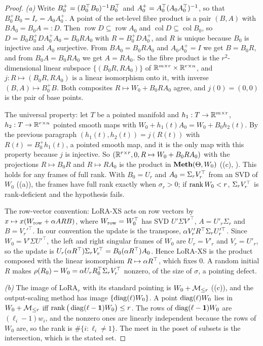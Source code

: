 \begin{proof}
\emph{(a)} Write $B_0^+=(B_0^{\top} B_0)^{-1}B_0^{\top}$ and $A_0^+=A_0^{\top}(A_0A_0^{\top})^{-1}$, so that $B_0^+B_0=I_r=A_0A_0^+$. A point of
the set-level fibre product is a pair $(B,A)$ with $BA_0=B_0A=:D$. Then $\operatorname{row}D\subseteq\operatorname{row}A_0$
and $\operatorname{col}D\subseteq\operatorname{col}B_0$, so $D=B_0B_0^+DA_0^+A_0=B_0RA_0$ with $R=B_0^+DA_0^+$, and $R$ is
unique because $B_0$ is injective and $A_0$ surjective. From $BA_0=B_0RA_0$ and $A_0A_0^+=I$ we get $B=B_0R$, and from
$B_0A=B_0RA_0$ we get $A=RA_0$. So the fibre product is the $r^2$-dimensional linear subspace $\{(B_0R,RA_0)\}$ of
$\mathbb{R}^{m\times r}\times\mathbb{R}^{r\times n}$, and $j:R\mapsto(B_0R,RA_0)$ is a linear isomorphism onto it, with inverse
$(B,A)\mapsto B_0^+B$. Both composites $R\mapsto W_0+B_0RA_0$ agree, and $j(0)=(0,0)$ is the pair of base points.

The universal property: let $T$ be a pointed manifold and $h_1:T\to\mathbb{R}^{m\times r}$, $h_2:T\to\mathbb{R}^{r\times n}$ pointed smooth
maps with $W_0+h_1(t)A_0=W_0+B_0h_2(t)$. By the previous paragraph $(h_1(t),h_2(t))=j(R(t))$ with $R(t)=B_0^+h_1(t)$, a
pointed smooth map, and it is the only map with this property because $j$ is injective. So $(\mathbb{R}^{r\times r},0,R\mapsto
W_0+B_0RA_0)$ with the projections $R\mapsto B_0R$ and $R\mapsto RA_0$ is the product in $\mathbf{Meth}(\Theta,W_0)$
((c), ). This holds for any frames of full rank. With $B_0=U_r$ and $A_0=\Sigma_rV_r^{\top}$ from an SVD
of $W_0$ ((a)), the frames have full rank exactly when $\sigma_r>0$; if $\operatorname{rank} W_0<r$, $\Sigma_rV_r^{\top}$ is
rank-deficient and the hypothesis fails.

The row-vector convention: LoRA-XS acts on row vectors by $x\mapsto x(W_{\rm row}+\alpha ARB)$, where $W_{\rm row}=W_0^{\top}$
has SVD $U'\Sigma V'^{\top}$, $A=U'_r\Sigma_r$ and $B=V_r'^{\top}$. In our convention the update is the transpose,
$\alpha V'_rR^{\top}\Sigma_rU_r'^{\top}$. Since $W_0=V'\Sigma U'^{\top}$, the left and right singular frames of $W_0$ are
$U_r=V'_r$ and $V_r=U'_r$, so the update is $U_r(\alpha R^{\top})\Sigma_rV_r^{\top}=B_0(\alpha R^{\top})A_0$. Hence LoRA-XS is the product
composed with the linear isomorphism $R\mapsto\alpha R^{\top}$, which fixes $0$. A random initial $R$ makes
$\rho(R_0)-W_0=\alpha U_rR_0^{\top}\Sigma_rV_r^{\top}$ nonzero, of the size of $\sigma$, a pointing defect.

\emph{(b)} The image of $\mathrm{LoRA}_r$ with its standard pointing is $W_0+\mathcal{M}_{\le r}$ ((c)), and the
output-scaling method has image $\{\operatorname{diag}(\ell)W_0\}$. A point $\operatorname{diag}(\ell)W_0$ lies in $W_0+\mathcal{M}_{\le r}$ iff
$\operatorname{rank}\big(\operatorname{diag}(\ell-\mathbf 1)W_0\big)\le r$. The rows of $\operatorname{diag}(\ell-\mathbf 1)W_0$ are $(\ell_i-1)w_i$, and the nonzero ones
are linearly independent because the rows of $W_0$ are, so the rank is $\#\{i:\ell_i\ne1\}$. The meet in the poset of
subsets is the intersection, which is the stated set.


\end{proof}
